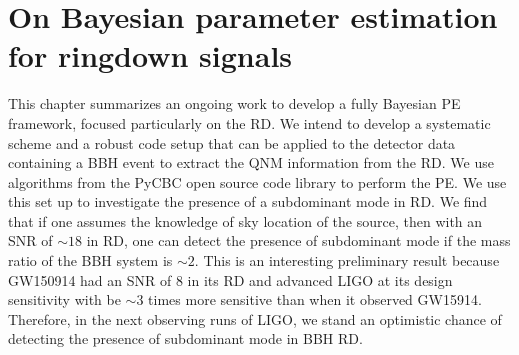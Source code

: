 \section{On Bayesian parameter estimation for ringdown signals}
This chapter summarizes an ongoing work to develop a fully Bayesian PE framework, focused particularly on the RD. We intend to develop a systematic scheme and a robust code setup that can be applied to the detector data containing a BBH event to extract the QNM information from the RD. We use algorithms from the PyCBC \cite{Canton:2014ena,Usman:2015kfa,Nitz:2017svb} open source code library to perform the PE.  We use this set up to investigate the presence of a subdominant mode in RD. We find that if one assumes the knowledge of sky location of the source, then with an SNR of $\sim 18$ in RD, one can detect the presence of subdominant mode if the mass ratio of the BBH system is $\sim 2$. This is an interesting preliminary result because GW150914 had an SNR of 8 in its RD and advanced LIGO at its design sensitivity with be $\sim 3$ times more sensitive than when it observed GW15914. Therefore, in the next observing runs of LIGO, we stand an optimistic chance of detecting the presence of subdominant mode in BBH RD. 














